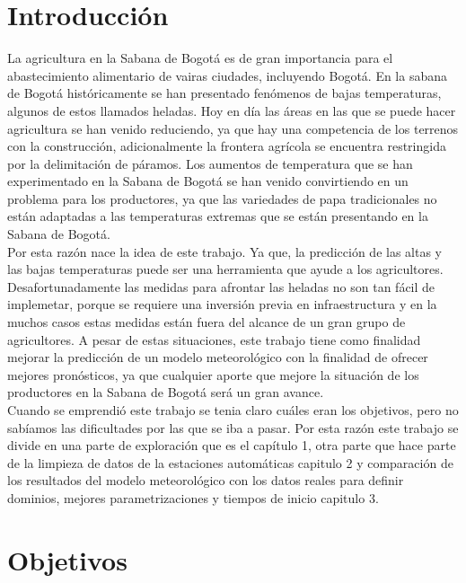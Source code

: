 \chapter{Introducción}
La agricultura en la Sabana de Bogotá es de gran importancia para el abastecimiento alimentario de vairas ciudades, incluyendo Bogotá. En la sabana de Bogotá históricamente se han presentado fenómenos de bajas temperaturas, algunos de estos llamados heladas. Hoy en día las áreas en las que se puede hacer agricultura se han venido reduciendo, ya que hay una competencia de los terrenos con la construcción, adicionalmente la frontera agrícola se encuentra restringida por la delimitación de páramos. Los aumentos de temperatura que se han experimentado en la Sabana de Bogotá se han venido convirtiendo en un problema para los productores, ya que las variedades de papa tradicionales no están adaptadas a las temperaturas extremas que se están presentando en la Sabana de Bogotá.\\

Por esta razón nace la idea de este trabajo. Ya que, la predicción de las altas y las bajas temperaturas puede ser una herramienta que ayude a los agricultores. Desafortunadamente las medidas para afrontar las heladas no son tan fácil de implemetar, porque se requiere una inversión previa en infraestructura y en la muchos casos estas medidas están fuera del alcance de un gran grupo de agricultores. A pesar de estas situaciones, este trabajo tiene como finalidad mejorar la predicción de un modelo meteorológico con la finalidad de ofrecer mejores pronósticos, ya que cualquier aporte que mejore la situación de los productores en la Sabana de Bogotá será un gran avance.\\

Cuando se emprendió este trabajo se tenia claro cuáles eran los objetivos, pero no sabíamos las dificultades por las que se iba a pasar. Por esta razón este trabajo se divide en una parte de exploración que es el capítulo 1, otra parte que hace parte de la limpieza de datos de la estaciones automáticas capitulo 2 y comparación de los resultados del modelo meteorológico con los datos reales para definir dominios, mejores parametrizaciones y tiempos de inicio capitulo 3.\\



\chapter{Objetivos}

